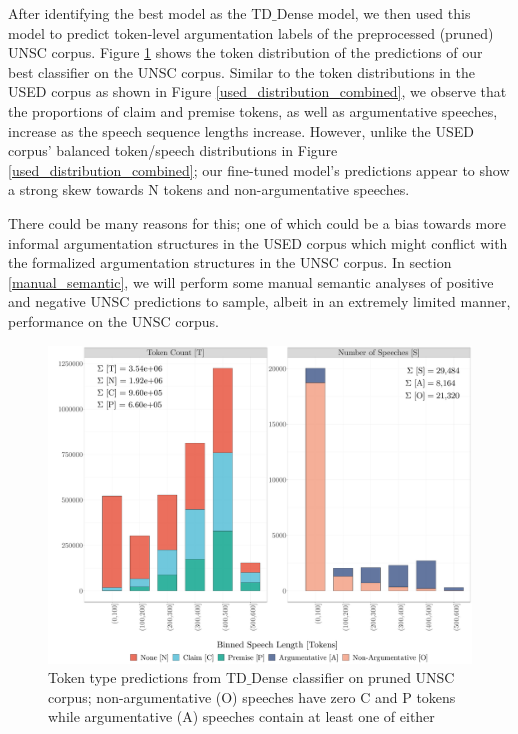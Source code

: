After identifying the best model as the TD$\_$Dense model, we then used this model to predict token-level argumentation labels of the preprocessed (pruned) UNSC corpus. Figure \ref{unsc_pred} shows the token distribution of the predictions of our best classifier on the UNSC corpus. Similar to the token distributions in the USED corpus as shown in Figure \ref{used_distribution_combined}, we observe that the proportions of claim and premise tokens, as well as argumentative speeches, increase as the speech sequence lengths increase. However, unlike the USED corpus' balanced token/speech distributions in Figure \ref{used_distribution_combined}; our fine-tuned model's predictions appear to show a strong skew towards N tokens and non-argumentative speeches.

There could be many reasons for this; one of which could be a bias towards more informal argumentation structures in the USED corpus which might conflict with the formalized argumentation structures in the UNSC corpus. In section \ref{manual_semantic}, we will perform some manual semantic analyses of positive and negative UNSC predictions to sample, albeit in an extremely limited manner, performance on the UNSC corpus. 

\begin{figure}[t!]
    \centering
    \includegraphics[trim={1.0cm 0cm 0cm
    0cm},clip,width=\textwidth]{img/token_dist_pred_UNSC_length.pdf}
    \caption{Token type predictions from TD$\_$Dense classifier on pruned UNSC corpus; non-argumentative (O) speeches have zero C and P tokens while argumentative (A) speeches contain at least one of either}
    \label{unsc_pred}
\end{figure}